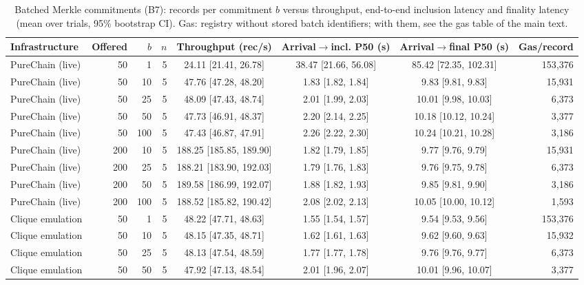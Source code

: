 \begin{table}[t]
\centering
\scriptsize
\caption{Batched Merkle commitments (B7): records per commitment $b$ versus throughput, end-to-end inclusion latency and finality latency (mean over trials, 95\% bootstrap CI). Gas: registry without stored batch identifiers; with them, see the gas table of the main text.}
\label{tab:batching}
\begin{adjustbox}{max width=\textwidth}
\begin{tabular}{lrrrcccr}
\toprule
Infrastructure & Offered & $b$ & $n$ & Throughput (rec/s) & Arrival$\rightarrow$incl. P50 (s) & Arrival$\rightarrow$final P50 (s) & Gas/record \\
\midrule
PureChain (live) & 50 & 1 & 5 & 24.11 [21.41, 26.78] & 38.47 [21.66, 56.08] & 85.42 [72.35, 102.31] & 153,376 \\
PureChain (live) & 50 & 10 & 5 & 47.76 [47.28, 48.20] & 1.83 [1.82, 1.84] & 9.83 [9.81, 9.83] & 15,931 \\
PureChain (live) & 50 & 25 & 5 & 48.09 [47.43, 48.74] & 2.01 [1.99, 2.03] & 10.01 [9.98, 10.03] & 6,373 \\
PureChain (live) & 50 & 50 & 5 & 47.73 [46.91, 48.37] & 2.20 [2.14, 2.25] & 10.18 [10.12, 10.24] & 3,377 \\
PureChain (live) & 50 & 100 & 5 & 47.43 [46.87, 47.91] & 2.26 [2.22, 2.30] & 10.24 [10.21, 10.28] & 3,186 \\
PureChain (live) & 200 & 10 & 5 & 188.25 [185.85, 189.90] & 1.82 [1.79, 1.85] & 9.77 [9.76, 9.79] & 15,931 \\
PureChain (live) & 200 & 25 & 5 & 188.21 [183.90, 192.03] & 1.79 [1.76, 1.83] & 9.76 [9.75, 9.78] & 6,373 \\
PureChain (live) & 200 & 50 & 5 & 189.58 [186.99, 192.07] & 1.88 [1.82, 1.93] & 9.85 [9.81, 9.90] & 3,186 \\
PureChain (live) & 200 & 100 & 5 & 188.52 [185.82, 190.42] & 2.08 [2.02, 2.13] & 10.05 [10.00, 10.12] & 1,593 \\
Clique emulation & 50 & 1 & 5 & 48.22 [47.71, 48.63] & 1.55 [1.54, 1.57] & 9.54 [9.53, 9.56] & 153,376 \\
Clique emulation & 50 & 10 & 5 & 48.15 [47.35, 48.71] & 1.62 [1.61, 1.63] & 9.62 [9.60, 9.63] & 15,932 \\
Clique emulation & 50 & 25 & 5 & 48.13 [47.54, 48.59] & 1.77 [1.77, 1.78] & 9.76 [9.76, 9.77] & 6,373 \\
Clique emulation & 50 & 50 & 5 & 47.92 [47.13, 48.54] & 2.01 [1.96, 2.07] & 10.01 [9.96, 10.07] & 3,377 \\

\end{tabular}
\end{adjustbox}
\end{table}
